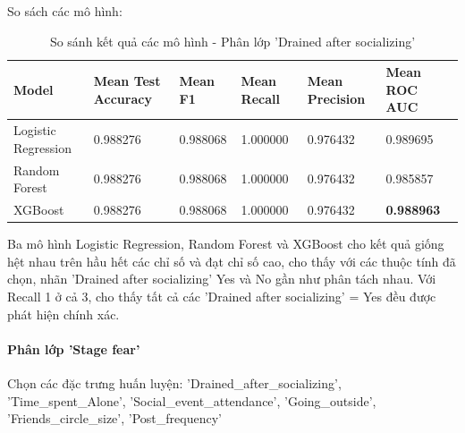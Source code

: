\begin{itemize}
            \FloatBarrier
    \end{itemize}

    So sách các mô hình:

    \begin{table}[htbp]
        \centering
        \caption{So sánh kết quả các mô hình - Phân lớp 'Drained after socializing'}
        \label{tab:Behavior-drain-compare}
        \begin{tabular}{|p{2cm}|p{2cm}|p{2cm}|p{2cm}|p{2cm}|p{2cm}|}
        \hline
            Model & Mean Test Accuracy & Mean F1 & Mean Recall & Mean Precision & Mean ROC AUC \\
            \hline
            Logistic Regression & 0.988276 & 0.988068 & 1.000000 & 0.976432 & 0.989695 \\
            \hline
            Random Forest & 0.988276 & 0.988068 & 1.000000 & 0.976432 & 0.985857 \\
            \hline
            XGBoost & 0.988276 & 0.988068 & 1.000000 & 0.976432 & \textbf{0.988963} \\
        \hline
        \end{tabular}
    \end{table}

    \FloatBarrier

    Ba mô hình Logistic Regression, Random Forest và XGBoost cho kết quả giống hệt nhau trên hầu hết các chỉ số và đạt chỉ số cao, cho thấy với các thuộc tính đã chọn, nhãn 'Drained after socializing' Yes và No gần như phân tách nhau. Với Recall 1 ở cả 3, cho thấy tất cả các 'Drained after socializing' = Yes đều được phát hiện chính xác. 

    \paragraph{Phân lớp 'Stage fear'}
    \leavevmode

    Chọn các đặc trưng huấn luyện: 'Drained\_after\_socializing', 'Time\_spent\_Alone', 'Social\_event\_attendance', 'Going\_outside', 'Friends\_circle\_size', 'Post\_frequency'

